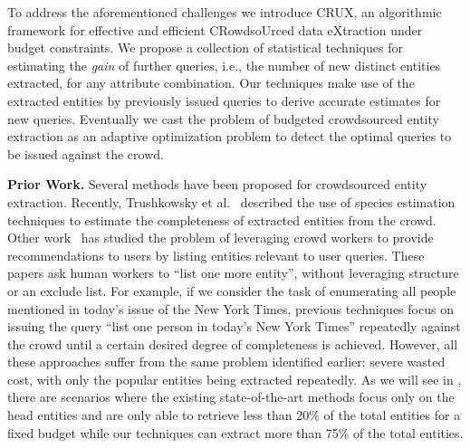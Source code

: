 To address the aforementioned challenges we introduce CRUX, an algorithmic framework for effective and efficient CRowdsoUrced data eXtraction under budget constraints. We propose a collection of  statistical techniques for estimating the {\em gain} of further queries, i.e., the number of new distinct entities extracted, for any attribute combination. Our techniques make use of the extracted entities by previously issued queries to derive accurate estimates for new queries. Eventually we cast the problem of budgeted crowdsourced entity extraction as an adaptive optimization problem to detect the optimal queries to be issued against the crowd.

\noindent
{\bf Prior Work.} Several methods have been proposed for crowdsourced entity extraction. Recently, Trushkowsky et al.~\cite{trushkowsky:2013}
described the use of species estimation techniques to estimate the completeness of extracted entities from the crowd. 
Other work~\cite{amsterdamer:2014} has studied the problem of leveraging crowd workers to provide recommendations to users by listing entities relevant to user queries. These papers ask human workers to ``list one more entity'', without leveraging structure or an exclude list. For example, if we consider the task of enumerating all people mentioned in today's issue of the New York Times, previous techniques focus on issuing the query ``list one person in today's New York Times'' repeatedly against the crowd until a certain desired degree of completeness is achieved.
However, all these approaches suffer from the same problem identified earlier: severe wasted cost,
with only the popular entities being extracted repeatedly. As we will see in , there are scenarios where the existing state-of-the-art methods focus only on the head entities and are only able to retrieve less than 20\% of the total entities for a fixed budget while our techniques can extract more than 75\% of the total entities.

